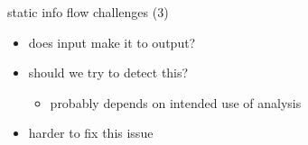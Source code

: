 \begin{frame}[fragile,label=dFlowChallenges3]{static info flow challenges (3)}
\begin{itemize}
\item does input make it to output?
\item should we try to detect this?
    \begin{itemize}
    \item probably depends on intended use of analysis
    \end{itemize}
\item harder to fix this issue
\end{itemize}
\end{frame}
